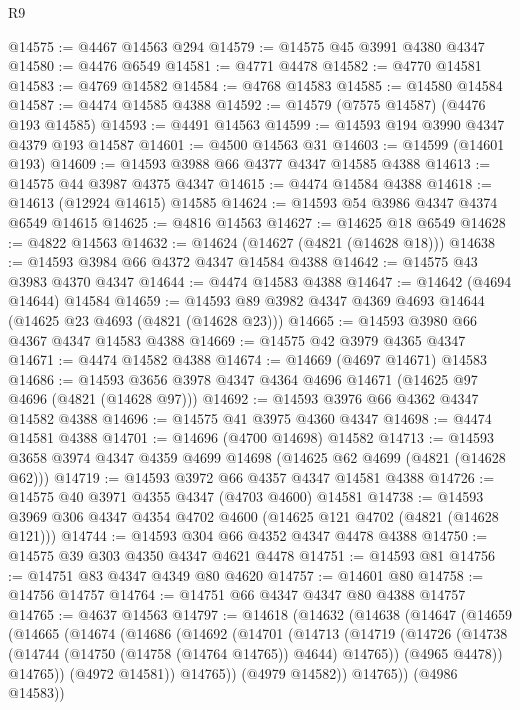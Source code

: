\begin{lexlean}{R9}
\begin{coremodule}
@14575 := @4467 @14563 @294
@14579 := @14575 @45 @3991 @4380 @4347
@14580 := @4476 @6549
@14581 := @4771 @4478
@14582 := @4770 @14581
@14583 := @4769 @14582
@14584 := @4768 @14583
@14585 := @14580 @14584
@14587 := @4474 @14585 @4388
@14592 := @14579 (@7575 @14587) (@4476 @193 @14585)
@14593 := @4491 @14563
@14599 := @14593 @194 @3990 @4347 @4379 @193 @14587
@14601 := @4500 @14563 @31
@14603 := @14599 (@14601 @193)
@14609 := @14593 @3988 @66 @4377 @4347 @14585 @4388
@14613 := @14575 @44 @3987 @4375 @4347
@14615 := @4474 @14584 @4388
@14618 := @14613 (@12924 @14615) @14585
@14624 := @14593 @54 @3986 @4347 @4374 @6549 @14615
@14625 := @4816 @14563
@14627 := @14625 @18 @6549
@14628 := @4822 @14563
@14632 := @14624 (@14627 (@4821 (@14628 @18)))
@14638 := @14593 @3984 @66 @4372 @4347 @14584 @4388
@14642 := @14575 @43 @3983 @4370 @4347
@14644 := @4474 @14583 @4388
@14647 := @14642 (@4694 @14644) @14584
@14659 := @14593 @89 @3982 @4347 @4369 @4693 @14644 (@14625 @23 @4693 (@4821 (@14628 @23)))
@14665 := @14593 @3980 @66 @4367 @4347 @14583 @4388
@14669 := @14575 @42 @3979 @4365 @4347
@14671 := @4474 @14582 @4388
@14674 := @14669 (@4697 @14671) @14583
@14686 := @14593 @3656 @3978 @4347 @4364 @4696 @14671 (@14625 @97 @4696 (@4821 (@14628 @97)))
@14692 := @14593 @3976 @66 @4362 @4347 @14582 @4388
@14696 := @14575 @41 @3975 @4360 @4347
@14698 := @4474 @14581 @4388
@14701 := @14696 (@4700 @14698) @14582
@14713 := @14593 @3658 @3974 @4347 @4359 @4699 @14698 (@14625 @62 @4699 (@4821 (@14628 @62)))
@14719 := @14593 @3972 @66 @4357 @4347 @14581 @4388
@14726 := @14575 @40 @3971 @4355 @4347 (@4703 @4600) @14581
@14738 := @14593 @3969 @306 @4347 @4354 @4702 @4600 (@14625 @121 @4702 (@4821 (@14628 @121)))
@14744 := @14593 @304 @66 @4352 @4347 @4478 @4388
@14750 := @14575 @39 @303 @4350 @4347 @4621 @4478
@14751 := @14593 @81
@14756 := @14751 @83 @4347 @4349 @80 @4620
@14757 := @14601 @80
@14758 := @14756 @14757
@14764 := @14751 @66 @4347 @4347 @80 @4388 @14757
@14765 := @4637 @14563
@14797 := @14618
    (@14632
      (@14638
        (@14647
          (@14659
            (@14665
              (@14674
                (@14686
                  (@14692
                    (@14701
                      (@14713
                        (@14719
                          (@14726
                            (@14738 (@14744 (@14750 (@14758 (@14764 @14765)) @4644) @14765))
                            (@4965 @4478))
                          @14765))
                      (@4972 @14581))
                    @14765))
                (@4979 @14582))
              @14765))
          (@4986 @14583))

\end{coremodule}
\end{lexlean}
